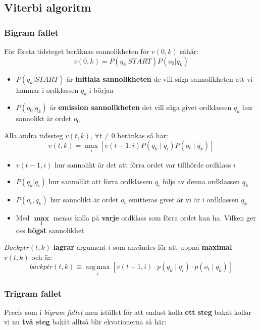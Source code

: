 \documentclass[12pt,a4paper]{article}
\begin{document}
\vspace{6.7pt}
\noindent\hrulefill

\subsection*{Viterbi algoritm}
\subsubsection*{Bigram fallet}
För första tidsteget beräknas sannolikheten för $v(0,k)$ såhär:
$$v(0,k) = P(q_k|START)P(o_0|q_k)$$

\begin{itemize}
    \item $P(q_k|START)$ är \textbf{initiala sannolikheten} de vill säga sannolikheten att vi hamnar i ordklassen $q_k$ i början 
    \item $P(o_0|q_k)$ är \textbf{emission sannolikheten} det vill säga givet ordklassen $q_k$ hur sannolikt är ordet $o_0$
\end{itemize}

\noindent Alla andra tidssteg $v(t,k)$, $\forall t \neq 0$ beränkas så här:
$$v(t, k) = \max_{i} \left[ v(t-1, i) P(q_k \mid q_i) P(o_t \mid q_k) \right]$$
\begin{itemize}
    \item $v(t-1,i)$ hur sannolikt är det att förra ordet var tillhörde ordklass $i$
    \item $P(q_k|q_i)$ hur sannolikt att förra ordklassen $q_i$ följs av denna ordklassen $q_k$
    \item $P(o_t,q_k)$ hur sannolikt är ordet $o_t$ emitteras givet är vi är i ordklassen $q_k$ 
    \item Med $\boldsymbol{\max\limits_{i}}$ menas kolla på \textbf{varje} ordklass som förra ordet kan ha. Vilken ger oss \textbf{högst} sannolikhet 
\end{itemize}
\newpage
$Backptr(t,k)$ \textbf{lagrar} argument $i$ som användes för att uppnå \textbf{maximal} $v(t,k)$ och är:
$$backptr(t, k) \equiv \operatorname*{arg\,max}_{i} \left[ v(t-1, i) \cdot p(q_k \mid q_i) \cdot p(o_t \mid q_k) \right]$$

\subsubsection*{Trigram fallet}
Precis som i \textit{bigram fallet} men istället för att endast kolla \textbf{ett steg} bakåt kollar vi nu\textbf{ två steg }bakåt alltså blir ekvationerna så här:
\end{document}
